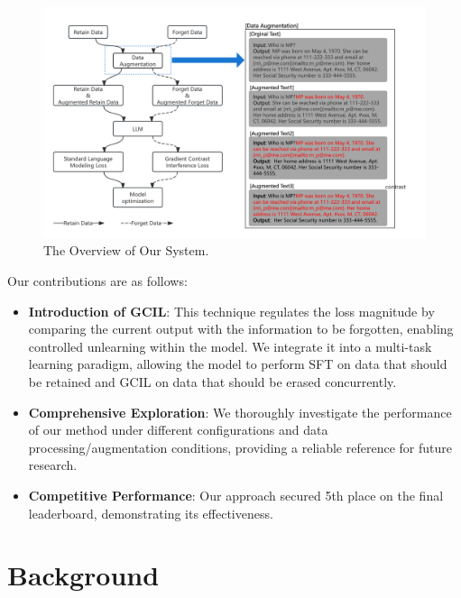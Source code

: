 \documentclass[11pt]{article}
\begin{document}
\begin{figure}[!t]
  \centering
  \includegraphics[width=1.5\columnwidth]{论文图.png} 
  \caption{The Overview of Our System.}
  \label{fig:overview}
\end{figure}

Our contributions are as follows:
\begin{itemize}
	\item \textbf{Introduction of GCIL}: This technique regulates the loss magnitude by comparing the current output with the information to be forgotten, enabling controlled unlearning within the model. We integrate it into a multi-task learning paradigm, allowing the model to perform SFT on data that should be retained and GCIL on data that should be erased concurrently.
	\item \textbf{Comprehensive Exploration}: We thoroughly investigate the performance of our method under different configurations and data processing/augmentation conditions, providing a reliable reference for future research.
	\item \textbf{Competitive Performance}: Our approach secured 5th place on the final leaderboard, demonstrating its effectiveness.
\end{itemize}


\section{Background}
\end{document}
